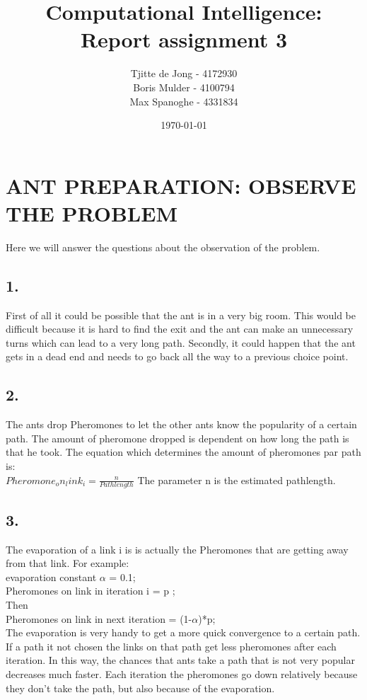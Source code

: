 \documentclass{scrartcl}
\begin{document}
\title{Computational Intelligence:
\\Report assignment 3}
\date{\today{}}

\author{
    \begin{tabular}{l r}
    	\\Tjitte de Jong - 4172930
	\\Boris Mulder - 4100794
        \\Max Spanoghe - 4331834
            \end{tabular}
  }
  
\maketitle \thispagestyle{empty} \pagebreak
  
\section*{ANT PREPARATION: OBSERVE THE PROBLEM}
  Here we will answer the questions about the observation of the problem.
  
\subsection*{1.}
First of all it could be possible that the ant is in a very big room. This would be difficult because it is hard to find the exit and the ant can make an unnecessary turns which can lead to a very long path.
Secondly, it could happen that the ant gets in a dead end and needs to go back all the way to a previous choice point.

\subsection*{2.}
The ants drop Pheromones to let the other ants know the popularity of a certain path. The amount of pheromone dropped is dependent on how long the path is that he took. The equation which determines the amount of pheromones par path is: \\
$Pheromone_on_link_i = \frac{n}{Path length}$
The parameter n is the estimated pathlength.

\subsection*{3.}
 The evaporation of a link i is is actually the Pheromones that are getting away from that link. For example:\\
 evaporation constant $\alpha$ = 0.1;\\
 Pheromones on link in iteration i = p ;\\
 Then \\
 Pheromones on link in next iteration = (1-$\alpha$)*p;\\
 The evaporation is very handy to get a more quick convergence to a certain path. If a path it not chosen the links on that path get less pheromones after each iteration. In this way, the chances that ants take a path that is not very popular decreases much faster. Each iteration the pheromones go down relatively because they don't take the path, but also because of the evaporation.
 \pagebreak
\end{document}
